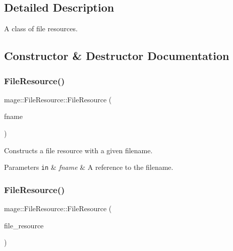 \subsection{Detailed Description}
A class of file resources. 

\subsection{Constructor \& Destructor Documentation}
\hypertarget{classmage_1_1_file_resource_ab126d9301d81c55b2aaacff86437e2d4}{}\label{classmage_1_1_file_resource_ab126d9301d81c55b2aaacff86437e2d4} 
\subsubsection{\texorpdfstring{File\+Resource()}{FileResource()}\hspace{0.1cm}{\footnotesize\ttfamily [1/3]}}
{\footnotesize\ttfamily mage\+::\+File\+Resource\+::\+File\+Resource (\begin{DoxyParamCaption}\item[{const wstring \&}]{fname }\end{DoxyParamCaption})\hspace{0.3cm}{\ttfamily [explicit]}}

Constructs a file resource with a given filename.


\begin{DoxyParams}[1]{Parameters}
\mbox{\tt in}  & {\em fname} & A reference to the filename. \\
\hline
\end{DoxyParams}
\hypertarget{classmage_1_1_file_resource_a5aa20ee42fcfc4ee6877438ed7377930}{}\label{classmage_1_1_file_resource_a5aa20ee42fcfc4ee6877438ed7377930} 
\subsubsection{\texorpdfstring{File\+Resource()}{FileResource()}\hspace{0.1cm}{\footnotesize\ttfamily [2/3]}}
{\footnotesize\ttfamily mage\+::\+File\+Resource\+::\+File\+Resource (\begin{DoxyParamCaption}\item[{const \hyperlink{classmage_1_1_file_resource}{File\+Resource} \&}]{file\+\_\+resource }\end{DoxyParamCaption})\hspace{0.3cm}{\ttfamily [delete]}}

